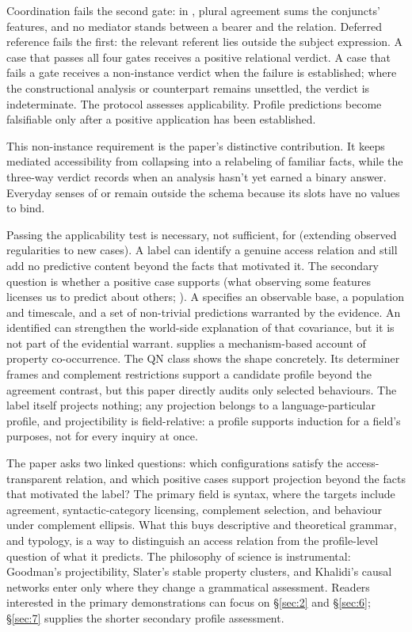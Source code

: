 Coordination fails the second gate: in , plural agreement sums the conjuncts' features, and no mediator stands between a bearer and the relation. Deferred reference fails the first: the relevant referent lies outside the subject expression. A case that passes all four gates receives a positive relational verdict. A case that fails a gate receives a non-instance verdict when the failure is established; where the constructional analysis or counterpart remains unsettled, the verdict is indeterminate. The protocol assesses applicability. Profile predictions become falsifiable only after a positive application has been established.

This non-instance requirement is the paper's distinctive contribution. It keeps mediated accessibility from collapsing into a relabeling of familiar facts, while the three-way verdict records when an analysis hasn't yet earned a binary answer. Everyday senses of  or  remain outside the schema because its slots have no values to bind.

Passing the applicability test is necessary, not sufficient, for  (extending observed regularities to new cases). A label can identify a genuine access relation and still add no predictive content beyond the facts that motivated it. The secondary question is whether a positive case supports  (what observing some features licenses us to predict about others; \citealp{Goodman1955}). A  specifies an observable base, a population and timescale, and a set of non-trivial predictions warranted by the evidence. An identified  can strengthen the world-side explanation of that covariance, but it is not part of the evidential warrant. \textcite{boyd1991} supplies a mechanism-based account of property co-occurrence. The QN class shows the shape concretely. Its determiner frames and complement restrictions support a candidate profile beyond the agreement contrast, but this paper directly audits only selected behaviours. The label  itself projects nothing; any projection belongs to a language-particular profile, and projectibility is field-relative: a profile supports induction for a field's purposes, not for every inquiry at once.

The paper asks two linked questions: which configurations satisfy the access-transparent relation, and which positive cases support projection beyond the facts that motivated the label? The primary field is syntax, where the targets include agreement, syntactic-category licensing, complement selection, and behaviour under complement ellipsis. What this buys descriptive and theoretical grammar, and typology, is a way to distinguish an access relation from the profile-level question of what it predicts. The philosophy of science is instrumental: Goodman's projectibility, Slater's stable property clusters, and Khalidi's causal networks enter only where they change a grammatical assessment. Readers interested in the primary demonstrations can focus on §\ref{sec:2} and §\ref{sec:6}; §\ref{sec:7} supplies the shorter secondary profile assessment.

